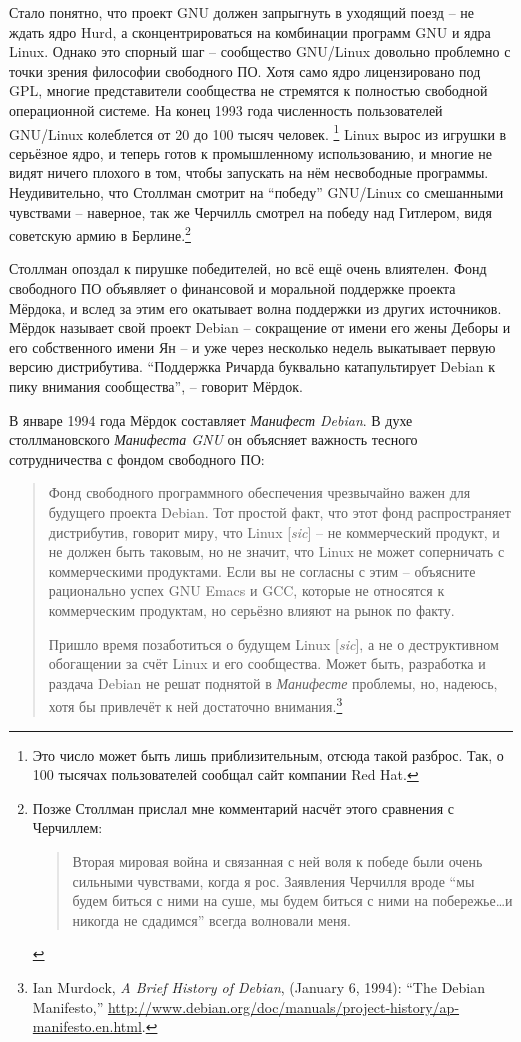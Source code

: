 Стало понятно, что проект GNU должен запрыгнуть в уходящий поезд -- не ждать ядро Hurd, а сконцентрироваться на комбинации программ GNU и ядра Linux. Однако это спорный шаг -- сообщество GNU/Linux довольно проблемно с точки зрения философии свободного ПО. Хотя само ядро лицензировано под GPL, многие представители сообщества не стремятся к полностью свободной операционной системе. На конец 1993 года численность пользователей GNU/Linux колеблется от 20 до 100 тысяч человек. \footnote{Это число может быть лишь приблизительным, отсюда такой разброс. Так, о 100 тысячах пользователей сообщал сайт компании Red Hat.} Linux вырос из игрушки в серьёзное ядро, и теперь готов к промышленному использованию, и многие не видят ничего плохого в том, чтобы запускать на нём несвободные программы. Неудивительно, что Столлман смотрит на \enquote{победу} GNU/Linux со смешанными чувствами -- наверное, так же Черчилль смотрел на победу над Гитлером, видя советскую армию в Берлине.\footnote{Позже Столлман прислал мне комментарий насчёт этого сравнения с Черчиллем:

\begin{quote}
Вторая мировая война и связанная с ней воля к победе были очень сильными чувствами, когда я рос. Заявления Черчилля вроде \enquote{мы будем биться с ними на суше, мы будем биться с ними на побережье\ldots и никогда не сдадимся} всегда волновали меня.
\end{quote}}

Столлман опоздал к пирушке победителей, но всё ещё очень влиятелен. Фонд свободного ПО объявляет о финансовой и моральной поддержке проекта Мёрдока, и вслед за этим его окатывает волна поддержки из других источников. Мёрдок называет свой проект Debian -- сокращение от имени его жены Деборы и его собственного имени Ян -- и уже через несколько недель выкатывает первую версию дистрибутива. \enquote{Поддержка Ричарда буквально катапультирует Debian к пику внимания сообщества}, -- говорит Мёрдок.

В январе 1994 года Мёрдок составляет \textit{Манифест Debian}. В духе столлмановского \textit{Манифеста GNU} он объясняет важность тесного сотрудничества с фондом свободного ПО:

\begin{quote}
Фонд свободного программного обеспечения чрезвычайно важен для будущего проекта Debian. Тот простой факт, что этот фонд распространяет дистрибутив, говорит миру, что Linux [\textit{sic}] -- не коммерческий продукт, и не должен быть таковым, но не значит, что Linux не может соперничать с коммерческими продуктами. Если вы не согласны с этим -- объясните рационально успех GNU Emacs и GCC, которые не относятся к коммерческим продуктам, но серьёзно влияют на рынок по факту.

Пришло время позаботиться о будущем Linux [\textit{sic}], а не о деструктивном обогащении за счёт Linux и его сообщества. Может быть, разработка и раздача Debian не решат поднятой в \textit{Манифесте} проблемы, но, надеюсь, хотя бы привлечёт к ней достаточно внимания.\footnote{Ian Murdock, \textit{A Brief History of Debian}, (January 6, 1994): \enquote{The Debian Manifesto,} \url{http://www.debian.org/doc/manuals/project-history/ap-manifesto.en.html}.}
\end{quote}

